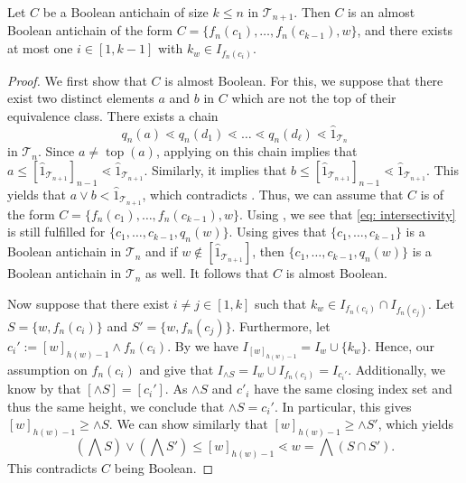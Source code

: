 \documentclass{preprint}
\newcommand{\topmap}{\operatorname{top}}
\newcommand{\cT}{\mathcal{T}}
\theoremstyle{definition}
\begin{document}
\begin{proposition}\label{prop: BooleanAreValid}
    Let $C$ be a Boolean antichain of size $k\leq n$ in $\cT_{n+1}$. Then $C$ is an almost Boolean antichain of the form $C=\{f_n(c_1),\dots,f_n(c_{k-1}),w\}$, and there exists at most one $i \in [1, k-1]$ with $k_w \in I_{f_n(c_i)}$.
\end{proposition}
\begin{proof}
    We first show that $C$ is almost Boolean. For this, we suppose that there exist two distinct elements $a$ and $b$ in $C$ which are not the top of their equivalence class. There exists a chain
    $$
        q_n(a) \lessdot q_n(d_1)\lessdot \dots \lessdot q_n(d_\ell) \lessdot \hat{1}_{\cT_n}
    $$
    in $\cT_n$. Since $a\neq \topmap(a)$, applying  on this chain implies that $a\leq [\hat{1}_{\cT_{n+1}}]_{n-1} \lessdot \hat{1}_{\cT_{n+1}}$. Similarly, it implies that $b \leq [\hat{1}_{\cT_{n+1}}]_{n-1} \lessdot \hat{1}_{\cT_{n+1}}$. This yields that $a\vee b < \hat{1}_{\cT_{n+1}}$, which contradicts . Thus, we can assume that $C$ is of the form $C=\{f_n(c_1),\dots,f_n(c_{k-1}),w\}$. Using , we see that \eqref{eq: intersectivity} is still fulfilled for $\{c_1,\dots,c_{k-1},q_n(w)\}$. Using  gives that $\{c_1,\dots,c_{k-1}\}$ is a Boolean antichain in $\cT_n$ and if $w \notin [\hat{1}_{\cT_{n+1}}]$, then $\{c_1,\dots,c_{k-1}, q_n(w)\}$ is a Boolean antichain in $\cT_n$ as well. It follows that $C$ is almost Boolean.

    Now suppose that there exist $i\neq j \in [1,k]$ such that $k_w \in I_{f_n(c_i)}\cap I_{f_n(c_j)}$. Let $S=\{w,f_n(c_i)\}$ and $S'=\{w,f_n(c_j)\}$. Furthermore, let $c_i':= [w]_{h(w)-1} \wedge f_n(c_i)$. By  we have $I_{[w]_{h(w)-1}} = I_w \cup \{k_w\}$. Hence, our assumption on $f_n(c_i)$ and  give that $I_{\wedge S} = I_w \cup I_{f_n(c_i)} = I_{c_i'}$. Additionally, we know by  that $[\wedge S] = [c_i']$. As $\wedge S$ and $c'_i$ have the same closing index set and thus the same height, we conclude that $\wedge S = c_i'$. In particular, this gives $[w]_{h(w)-1} \geq \wedge S$. We can show similarly that $[w]_{h(w)-1} \geq \wedge S'$, which yields
    $$
    \left(\bigwedge S\right) \vee \left(\bigwedge S'\right) \leq [w]_{h(w)-1}\lessdot w = \bigwedge (S\cap S').
    $$
    This contradicts $C$ being Boolean.
\end{proof}
\end{document}
